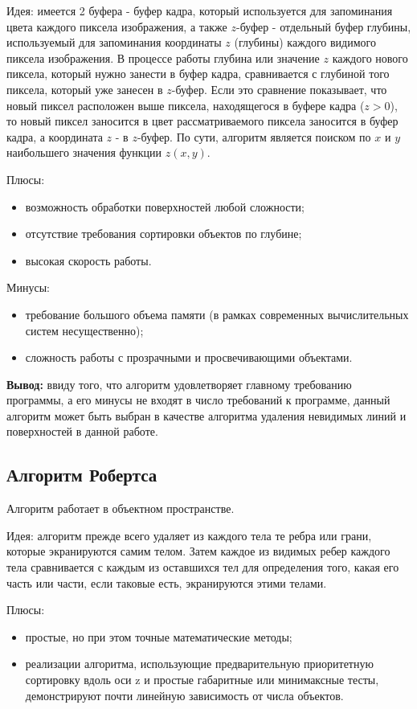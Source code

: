 Идея: имеется 2 буфера - буфер кадра, который используется для запоминания цвета каждого пиксела изображения, а также $z$-буфер - отдельный буфер глубины, используемый для запоминания координаты $z$ (глубины) каждого видимого пиксела изображения. В процессе работы глубина или значение $z$ каждого нового пиксела, который нужно занести в буфер кадра, сравнивается с глубиной того пиксела, который уже занесен в $z$-буфер. Если это сравнение показывает, что новый пиксел расположен выше пиксела, находящегося в буфере кадра ($z > 0$), то новый пиксел заносится в цвет рассматриваемого пиксела заносится в буфер кадра, а координата $z$ - в $z$-буфер. По сути, алгоритм является поиском по $x$ и $y$ наибольшего значения функции $z(x, y)$.

Плюсы:
\begin{itemize}
    \item возможность обработки поверхностей любой сложности;
    \item отсутствие требования сортировки объектов по глубине;
    \item высокая скорость работы.
\end{itemize}

Минусы:
\begin{itemize}
    \item требование большого объема памяти (в рамках современных вычислительных систем несущественно);
    \item сложность работы с прозрачными и просвечивающими объектами.
\end{itemize}

\textbf{Вывод:} ввиду того, что алгоритм удовлетворяет главному требованию программы, а его минусы не входят в число требований к программе, данный алгоритм может быть выбран в качестве алгоритма удаления невидимых линий и поверхностей в данной работе.

\subsection{Алгоритм Робертса}
Алгоритм работает в объектном пространстве. 

Идея: алгоритм прежде всего удаляет из каждого тела те ребра или грани, которые экранируются самим телом. Затем каждое из видимых ребер каждого тела сравнивается с каждым из оставшихся тел для определения того, какая его часть или части, если таковые есть, экранируются этими телами. 

Плюсы:
\begin{itemize}
    \item простые, но при этом точные математические методы;
    \item реализации алгоритма, использующие предварительную приоритетную сортировку вдоль оси z и простые габаритные или минимаксные тесты, демонстрируют почти линейную зависимость от числа объектов.
\end{itemize}

